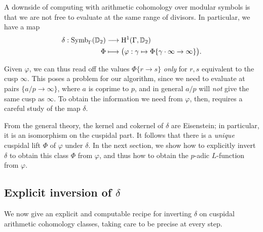 \documentclass[a4paper,11pt]{article}
\numberwithin{equation}{section}
\begin{document}

A downside of computing with arithmetic cohomology over modular symbols is that we are not free to evaluate at the same range of divisors. In particular, we have a map
\begin{align*}
	\delta : \mathrm{Symb}_{\Gamma}(\mathbb{D}_2) &\longrightarrow \mathrm{H}^1(\Gamma,\mathbb{D}_2)\\
    \Phi &\longmapsto \big(\varphi: \gamma \mapsto \Phi\{\gamma\cdot\infty \rightarrow \infty\}\big).
\end{align*}

 Given $\varphi$, we can thus read off the values $\Phi\{r \to s\}$ \emph{only} for $r,s$ equivalent to the cusp $\infty$. This poses a problem for our algorithm, since we need to evaluate at pairs $\{a/p \to \infty\}$, where $a$ is coprime to $p$, and in general $a/p$ will \emph{not} give the same cusp as $\infty$. To obtain the information we need from $\varphi$, then, requires a careful study of the map $\delta$.

From the general theory, the kernel and cokernel of $\delta$ are Eisenstein; in particular, it is an isomorphism on the cuspidal part. It follows that there is a \emph{unique} cuspidal lift $\Phi$ of $\varphi$ under $\delta$. In the next section, we show how to explicitly invert $\delta$ to obtain this class $\Phi$ from $\varphi$, and thus how to obtain the $p$-adic $L$-function from $\varphi$.



\subsection{Explicit inversion of $\delta$}

We now give an explicit and computable recipe for inverting $\delta$ on cuspidal arithmetic cohomology classes, taking care to be precise at every step.
\end{document}
